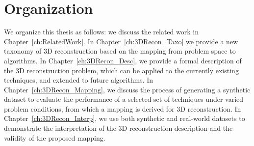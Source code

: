 \section{Organization}
We organize this thesis as follows: we discuss the related work in Chapter~\ref{ch:RelatedWork}. In Chapter~\ref{ch:3DRecon_Taxo} we provide a new taxonomy of 3D reconstruction based on the mapping from problem space to algorithms. In Chapter~\ref{ch:3DRecon_Desc}, we provide a formal description of the 3D reconstruction problem, which can be applied to the currently existing techniques, and extended to future algorithms. In Chapter~\ref{ch:3DRecon_Mapping}, we discuss the process of generating a synthetic dataset to evaluate the performance of a selected set of techniques under varied problem conditions, from which a mapping is derived for 3D reconstruction. In Chapter~\ref{ch:3DRecon_Interp}, we use both synthetic and real-world datasets to demonstrate the interpretation of the 3D reconstruction description and the validity of the proposed mapping.